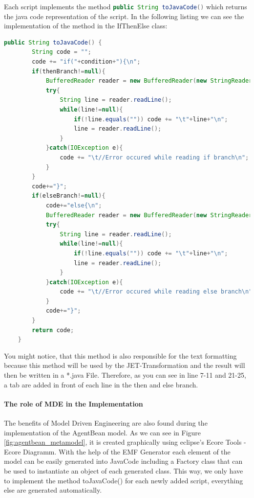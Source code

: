 Each script implements the method \lstinline[language=Java]{public String toJavaCode()} which returns the java code representation of the script.
In the following listing we can see the implementation of the method in the IfThenElse class:
\begin{lstlisting}[language = Java, caption = toJavaCode() implementation in the IfThenElse class]
	public String toJavaCode() {
		String code = "";
		code += "if("+condition+"){\n";
		if(thenBranch!=null){
			BufferedReader reader = new BufferedReader(new StringReader(thenBranch.toJavaCode()));
			try{
				String line = reader.readLine();
				while(line!=null){
					if(!line.equals("")) code += "\t"+line+"\n";
					line = reader.readLine();
				}
			}catch(IOException e){
				code += "\t//Error occured while reading if branch\n";
			}
		}
		code+="}";
		if(elseBranch!=null){
			code+="else{\n";
			BufferedReader reader = new BufferedReader(new StringReader(elseBranch.toJavaCode()));
			try{
				String line = reader.readLine();
				while(line!=null){
					if(!line.equals("")) code += "\t"+line+"\n";
					line = reader.readLine();
				}
			}catch(IOException e){
				code += "\t//Error occured while reading else branch\n";
			}
			code+="}";
		}
		return code;
	}
\end{lstlisting}

You might notice, that this method is also responsible for the text formatting because this method will be used by the JET-Transformation and the result will then be written in a *.java File. Therefore, as you can see in line 7-11 and 21-25, a tab are added in front of each line in the then and else branch.\\\\
\textbf{The role of MDE in the Implementation}\\\\
The benefits of Model Driven Engineering are also found during the implementation of the AgentBean model. As we can see in Figure \ref{fig:agentbean_metamodel}, it is created graphically using eclipse's Ecore Tools - Ecore Diagramm. With the help of the EMF Generator each element of the model can be easily generated into JavaCode including a Factory class that can be used to instantiate an object of each generated class. This way, we only have to implement the method toJavaCode() for each newly added script, everything else are generated automatically. 


\newpage
